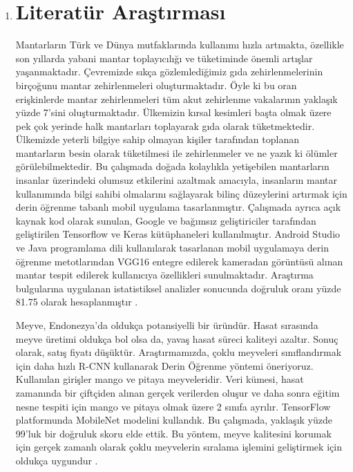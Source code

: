 \documentclass[12pt,a4paper]{article}
\begin{document}
	\begin{enumerate}
		\clearpage
		\item		
		
		
		\begin{center}
			\section*{Literatür Araştırması}			
		\end{center}		
		
		Mantarların Türk ve Dünya mutfaklarında kullanımı hızla artmakta, özellikle son
		yıllarda yabani mantar toplayıcılığı ve tüketiminde önemli artışlar yaşanmaktadır.
		Çevremizde sıkça gözlemlediğimiz gıda zehirlenmelerinin birçoğunu mantar zehirlenmeleri oluşturmaktadır. Öyle ki bu oran erişkinlerde mantar zehirlenmeleri tüm
		akut zehirlenme vakalarının yaklaşık yüzde 7'sini oluşturmaktadır. Ülkemizin kırsal kesimleri
		başta olmak üzere pek çok yerinde halk mantarları toplayarak gıda olarak tüketmektedir.
		Ülkemizde yeterli bilgiye sahip olmayan kişiler tarafından toplanan mantarların besin
		olarak tüketilmesi ile zehirlenmeler ve ne yazık ki ölümler görülebilmektedir. Bu
		çalışmada doğada kolaylıkla yetişebilen mantarların insanlar üzerindeki olumsuz
		etkilerini azaltmak amacıyla, insanların mantar kullanımında bilgi sahibi olmalarını
		sağlayarak bilinç düzeylerini artırmak için derin öğrenme tabanlı mobil uygulama
		tasarlanmıştır. Çalışmada ayrıca açık kaynak kod olarak sunulan, Google ve bağımsız
		geliştiriciler tarafından geliştirilen Tensorflow ve Keras kütüphaneleri kullanılmıştır.
		Android Studio ve Java programlama dili kullanılarak tasarlanan mobil uygulamaya derin
		öğrenme metotlarından VGG16 entegre edilerek kameradan görüntüsü alınan mantar
		tespit edilerek kullanıcıya özellikleri sunulmaktadır. Araştırma bulgularına uygulanan
		istatistiksel analizler sonucunda doğruluk oranı yüzde 81.75 olarak hesaplanmıştır
		\cite{akin2023dogada}.
		
		
		
		
		
		
		
		
		
		Meyve, Endonezya'da oldukça potansiyelli bir üründür. Hasat sırasında meyve üretimi oldukça bol olsa da, yavaş hasat süreci kaliteyi azaltır. Sonuç olarak, satış fiyatı düşüktür. Araştırmamızda, çoklu meyveleri sınıflandırmak için daha hızlı R-CNN kullanarak Derin Öğrenme yöntemi öneriyoruz. Kullanılan girişler mango ve pitaya meyveleridir. Veri kümesi, hasat zamanında bir çiftçiden alınan gerçek verilerden oluşur ve daha sonra eğitim nesne tespiti için mango ve pitaya olmak üzere 2 sınıfa ayrılır. TensorFlow platformunda MobileNet modelini kullandık. Bu çalışmada, yaklaşık yüzde 99'luk bir doğruluk skoru elde ettik. Bu yöntem, meyve kalitesini korumak için gerçek zamanlı olarak çoklu meyvelerin sıralama işlemini geliştirmek için oldukça uygundur \cite{8628566}.
		

\end{enumerate}
\end{document}
